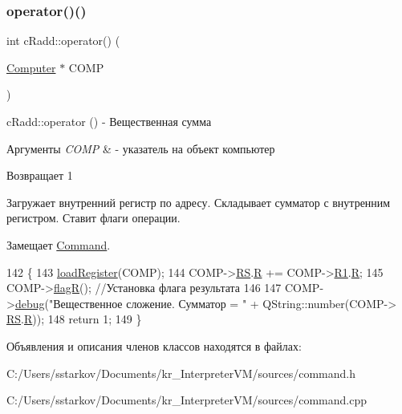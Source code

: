 \subsubsection{\texorpdfstring{operator()()}{operator()()}}
{\footnotesize\ttfamily int c\+Radd\+::operator() (\begin{DoxyParamCaption}\item[{\hyperlink{class_computer}{Computer} $\ast$}]{C\+O\+MP }\end{DoxyParamCaption})\hspace{0.3cm}{\ttfamily [virtual]}}



c\+Radd\+::operator () -\/ Вещественная сумма 


\begin{DoxyParams}{Аргументы}
{\em C\+O\+MP} & -\/ указатель на объект компьютер \\
\hline
\end{DoxyParams}
\begin{DoxyReturn}{Возвращает}
1
\end{DoxyReturn}
Загружает внутренний регистр по адресу. Складывает сумматор с внутренним регистром. Ставит флаги операции. 

Замещает \hyperlink{class_command_a79939b66f3de892e91d7710844294716}{Command}.


\begin{DoxyCode}
142 \{
143     \hyperlink{class_command_aac6f368e7c9dbb357b3f00627d5dabfc}{loadRegister}(COMP);
144     COMP->\hyperlink{class_computer_a874503110664b3cf821118d2ce9c2b96}{RS}.\hyperlink{union_computer_1_1data_acbf8c96e22bd094bcbb4014818e3570d}{R} += COMP->\hyperlink{class_computer_a0fbf84599b7db9d634a92afed443ee73}{R1}.\hyperlink{union_computer_1_1data_acbf8c96e22bd094bcbb4014818e3570d}{R};
145     COMP->\hyperlink{class_computer_aae860bb217270ec88e8ebf6fe2c2adc9}{flagR}(); \textcolor{comment}{//Установка флага результата}
146 
147     COMP->\hyperlink{class_computer_a10ca6c6b200630119201de16d7368e0f}{debug}(\textcolor{stringliteral}{"Вещественное сложение. Сумматор = "} + QString::number(COMP->
      \hyperlink{class_computer_a874503110664b3cf821118d2ce9c2b96}{RS}.\hyperlink{union_computer_1_1data_acbf8c96e22bd094bcbb4014818e3570d}{R}));
148     \textcolor{keywordflow}{return} 1;
149 \}
\end{DoxyCode}


Объявления и описания членов классов находятся в файлах\+:\begin{DoxyCompactItemize}
\item 
C\+:/\+Users/sstarkov/\+Documents/kr\+\_\+\+Interpreter\+V\+M/sources/command.\+h\item 
C\+:/\+Users/sstarkov/\+Documents/kr\+\_\+\+Interpreter\+V\+M/sources/command.\+cpp\end{DoxyCompactItemize}
